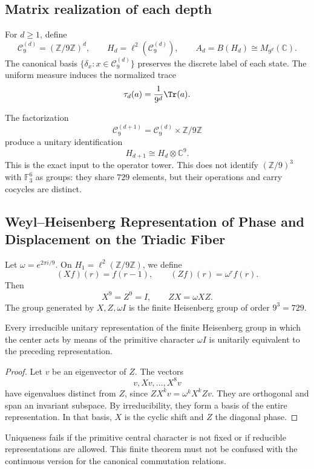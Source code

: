 \subsection{Matrix realization of each depth}

For \(d\ge1\), define
\[
  \mathcal C_9^{(d)}=(\mathbb Z/9\mathbb Z)^d,
  \qquad
  H_d=\ell^2(\mathcal C_9^{(d)}),
  \qquad
  A_d=B(H_d)\cong M_{9^d}(\mathbb C).
\]
The canonical basis \(\{\delta_x:x\in\mathcal C_9^{(d)}\}\) preserves the
discrete label of each state. The uniform measure induces the normalized
trace
\[
  \tau_d(a)=\frac{1}{9^d}\Tr(a).
\]

The factorization
\[
  \mathcal C_9^{(d+1)}
  =
  \mathcal C_9^{(d)}\times\mathbb Z/9\mathbb Z
\]
produce a unitary identification
\[
  H_{d+1}\cong H_d\otimes\mathbb C^9.
\]
This is the exact input to the operator tower. This does not identify
\((\mathbb Z/9)^3\) with \(\mathbb F_3^6\) as groups: they share \(729\)
elements, but their operations and carry cocycles are distinct.

\subsection{Weyl–Heisenberg Representation of Phase and Displacement on the Triadic Fiber}

Let \(\omega=e^{2\pi i/9}\). On
\(H_1=\ell^2(\mathbb Z/9\mathbb Z)\), we define
\[
  (Xf)(r)=f(r-1),
  \qquad
  (Zf)(r)=\omega^r f(r).
\]
Then
\[
  X^9=Z^9=I,
  \qquad
  ZX=\omega XZ.
\]
The group generated by \(X,Z,\omega I\) is the finite Heisenberg group of
order \(9^3=729\).

\begin{theorem}
Every irreducible unitary representation of the finite Heisenberg group in
which the center acts by means of the primitive character
\(\omega I\) is unitarily equivalent to the preceding representation.
\end{theorem}

\begin{proof}
Let \(v\) be an eigenvector of \(Z\). The vectors
\[
  v,Xv,\ldots,X^8v
\]
have eigenvalues distinct from \(Z\), since
\(ZX^kv=\omega^kX^kZv\). They are orthogonal and span an invariant
subspace. By irreducibility, they form a basis of the entire representation.
In that basis, \(X\) is the cyclic shift and \(Z\) the diagonal phase.
\end{proof}

\begin{controlbox}
Uniqueness fails if the primitive central character is not fixed or if
reducible representations are allowed. This finite theorem must not be confused
with the continuous version for the canonical commutation relations.
\end{controlbox}

